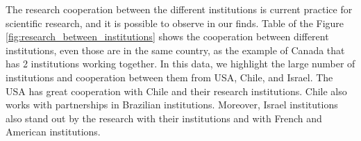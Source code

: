 \begin{landscape}
 	\begin{figure}[htb] 
   	    \captionsetup{width=25cm}%
	\end{figure}
\end{landscape}

The research cooperation between the different institutions is current practice for scientific research, and it is possible to observe in our finds. Table of the Figure \ref{fig:research_between_institutions} shows the cooperation between different institutions, even those are in the same country, as the example of Canada that has 2 institutions working together. In this data, we highlight the large number of institutions and cooperation between them from USA, Chile, and Israel. The USA has great cooperation with Chile and their research institutions. Chile also works with partnerships in Brazilian institutions. Moreover, Israel institutions also stand out by the research with their institutions and with French and American institutions.

\begin{figure}[htb] 
   	    \captionsetup{width=16cm}%
\end{figure}


